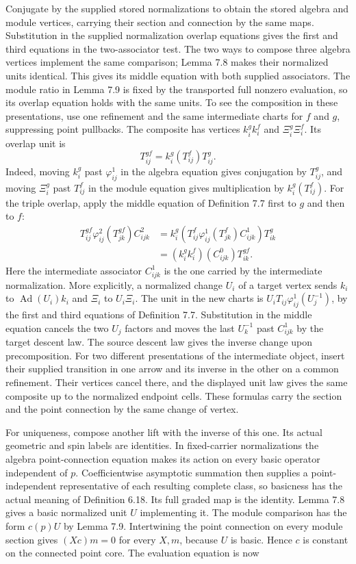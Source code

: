 \documentclass[
  english,
  11pt,
  reqno]{amsart}
\begin{document}
Conjugate by the supplied stored normalizations to obtain the stored
algebra and module vertices, carrying their section and connection by
the same maps. Substitution in the supplied normalization overlap
equations gives the first and third equations in the two-associator
test. The two ways to compose three algebra vertices implement the same
comparison; Lemma 7.8 makes their normalized units identical. This gives
its middle equation with both supplied associators. The module ratio in
Lemma 7.9 is fixed by the transported full nonzero evaluation, so its
overlap equation holds with the same units. To see the composition in
these presentations, use one refinement and the same intermediate charts
for \(f\) and \(g\), suppressing point pullbacks. The composite has
vertices \(k_i^g k_i^f\) and \(\Xi_i^g\Xi_i^f\). Its overlap unit is \[
T^{gf}_{ij}=k_i^g(T^f_{ij})T^g_{ij}.
\] Indeed, moving \(k_i^g\) past \(\varphi^1_{ij}\) in the algebra
equation gives conjugation by \(T^g_{ij}\), and moving \(\Xi_i^g\) past
\(T^f_{ij}\) in the module equation gives multiplication by
\(k_i^g(T^f_{ij})\). For the triple overlap, apply the middle equation
of Definition 7.7 first to \(g\) and then to \(f\): \[
\begin{aligned}
T^{gf}_{ij}\varphi^2_{ij}(T^{gf}_{jk})C^2_{ijk}
 &= k_i^g\!\left(T^f_{ij}\varphi^1_{ij}(T^f_{jk})C^1_{ijk}\right)T^g_{ik}\\
 &= (k_i^g k_i^f)(C^0_{ijk})T^{gf}_{ik}.
\end{aligned}
\] Here the intermediate associator \(C^1_{ijk}\) is the one carried by
the intermediate normalization. More explicitly, a normalized change
\(U_i\) of a target vertex sends \(k_i\) to
\(\operatorname{Ad}(U_i)k_i\) and \(\Xi_i\) to \(U_i\Xi_i\). The unit in
the new charts is \(U_iT_{ij}\varphi^1_{ij}(U_j^{-1})\), by the first
and third equations of Definition 7.7. Substitution in the middle
equation cancels the two \(U_j\) factors and moves the last \(U_k^{-1}\)
past \(C^1_{ijk}\) by the target descent law. The source descent law
gives the inverse change upon precomposition. For two different
presentations of the intermediate object, insert their supplied
transition in one arrow and its inverse in the other on a common
refinement. Their vertices cancel there, and the displayed unit law
gives the same composite up to the normalized endpoint cells. These
formulas carry the section and the point connection by the same change
of vertex.

For uniqueness, compose another lift with the inverse of this one. Its
actual geometric and spin labels are identities. In fixed-carrier
normalizations the algebra point-connection equation makes its action on
every basic operator independent of \(p\). Coefficientwise asymptotic
summation then supplies a point-independent representative of each
resulting complete class, so basicness has the actual meaning of
Definition 6.18. Its full graded map is the identity. Lemma 7.8 gives a
basic normalized unit \(U\) implementing it. The module comparison has
the form \(c(p)U\) by Lemma 7.9. Intertwining the point connection on
every module section gives \((Xc)m=0\) for every \(X,m\), because \(U\)
is basic. Hence \(c\) is constant on the connected point core. The
evaluation equation is now
\end{document}
